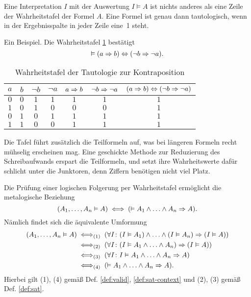 Eine Interpretation $I$ mit der Auswertung $I\models A$ ist nichts
anderes als eine Zeile der Wahrheitstafel der Formel $A$. Eine Formel
ist genau dann tautologisch, wenn in der Ergebnisspalte in jeder
Zeile eine~1 steht.

Ein Beispiel. Die Wahrheitstafel \ref{tab:Tautologie-zur-Kontraposition}
bestätigt
\[\vDash (a\Rightarrow b)\Leftrightarrow (\lnot b\Rightarrow\lnot a).\]

\begin{table}
\caption{Wahrheitstafel der Tautologie zur Kontraposition}
\label{tab:Tautologie-zur-Kontraposition}
\centering
\begin{tabular}{cc@{\quad\;\;}c@{\quad\;\;}c@{\quad\;\;}c@{\quad\;\;}c@{\quad\;\;}c}
\toprule
$a$ & $b$ & $\lnot b$ & $\lnot a$ & $a\Rightarrow b$ & $\lnot b\Rightarrow\lnot a$
& $(a\Rightarrow b)\Leftrightarrow (\lnot b\Rightarrow\lnot a)$\\
\midrule[\heavyrulewidth]
$0$ & $0$ & $1$ & $1$ & $1$ & $1$ & $1$ \\
$1$ & $0$ & $1$ & $0$ & $0$ & $0$ & $1$ \\
$0$ & $1$ & $0$ & $1$ & $1$ & $1$ & $1$ \\
$1$ & $1$ & $0$ & $0$ & $1$ & $1$ & $1$ \\
\bottomrule
\end{tabular}
\end{table}

\noindent
Die Tafel führt zusätzlich die Teilformeln auf, was bei längeren
Formeln recht mühselig erscheinen mag. Eine geschickte Methode zur
Reduzierung des Schreibaufwands erspart die Teilformeln, und setzt ihre
Wahrheitswerte dafür schlicht unter die Junktoren, denn Ziffern
benötigen nicht viel Platz.

Die Prüfung einer logischen Folgerung per Wahrheitstafel
ermöglicht die metalogische Beziehung
\[(A_1,\ldots,A_n\vDash A) \iff (\vDash A_1\land\ldots\land A_n\Rightarrow A).\]
Nämlich findet sich die äquivalente Umformung
\begin{align*}
(A_1,\ldots,A_n\vDash A)
&\;\Longleftrightarrow_{\text{(1)}}\;
(\forall I\colon (I\vDash A_1)\land\ldots\land (I\vDash A_n)\Rightarrow (I\vDash A))\\
&\;\Longleftrightarrow_{\text{(2)}}\;
(\forall I\colon (I\vDash A_1\land\ldots\land A_n)\Rightarrow (I\vDash A))\\
&\;\Longleftrightarrow_{\text{(3)}}\;
(\forall I\colon I\vDash A_1\land\ldots\land A_n\Rightarrow A)\\
&\;\Longleftrightarrow_{\text{(4)}}\;
(\vDash A_1\land\ldots\land A_n\Rightarrow A).
\end{align*}
Hierbei gilt (1), (4) gemäß Def. \ref{def:valid}, \ref{def:sat-context}
und (2), (3) gemäß Def. \ref{def:sat}.

